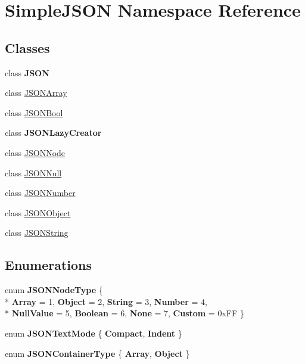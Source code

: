 \hypertarget{namespaceSimpleJSON}{}\section{Simple\+J\+S\+ON Namespace Reference}
\label{namespaceSimpleJSON}
\subsection*{Classes}
\begin{DoxyCompactItemize}
\item 
class {\bfseries J\+S\+ON}
\item 
class \hyperlink{classSimpleJSON_1_1JSONArray}{J\+S\+O\+N\+Array}
\item 
class \hyperlink{classSimpleJSON_1_1JSONBool}{J\+S\+O\+N\+Bool}
\item 
class {\bfseries J\+S\+O\+N\+Lazy\+Creator}
\item 
class \hyperlink{classSimpleJSON_1_1JSONNode}{J\+S\+O\+N\+Node}
\item 
class \hyperlink{classSimpleJSON_1_1JSONNull}{J\+S\+O\+N\+Null}
\item 
class \hyperlink{classSimpleJSON_1_1JSONNumber}{J\+S\+O\+N\+Number}
\item 
class \hyperlink{classSimpleJSON_1_1JSONObject}{J\+S\+O\+N\+Object}
\item 
class \hyperlink{classSimpleJSON_1_1JSONString}{J\+S\+O\+N\+String}
\end{DoxyCompactItemize}
\subsection*{Enumerations}
\begin{DoxyCompactItemize}
\item 
enum {\bfseries J\+S\+O\+N\+Node\+Type} \{ \\*
{\bfseries Array} = 1, 
{\bfseries Object} = 2, 
{\bfseries String} = 3, 
{\bfseries Number} = 4, 
\\*
{\bfseries Null\+Value} = 5, 
{\bfseries Boolean} = 6, 
{\bfseries None} = 7, 
{\bfseries Custom} = 0x\+FF
 \}\hypertarget{namespaceSimpleJSON_a62af00acc7925cc0284e634fb10626f5}{}\label{namespaceSimpleJSON_a62af00acc7925cc0284e634fb10626f5}

\item 
enum {\bfseries J\+S\+O\+N\+Text\+Mode} \{ {\bfseries Compact}, 
{\bfseries Indent}
 \}\hypertarget{namespaceSimpleJSON_a3981ef39adf14ef6bd21bd800720ca0e}{}\label{namespaceSimpleJSON_a3981ef39adf14ef6bd21bd800720ca0e}

\item 
enum {\bfseries J\+S\+O\+N\+Container\+Type} \{ {\bfseries Array}, 
{\bfseries Object}
 \}\hypertarget{namespaceSimpleJSON_a578bdc97500e35847d46ca39a6ce3df9}{}\label{namespaceSimpleJSON_a578bdc97500e35847d46ca39a6ce3df9}

\end{DoxyCompactItemize}
